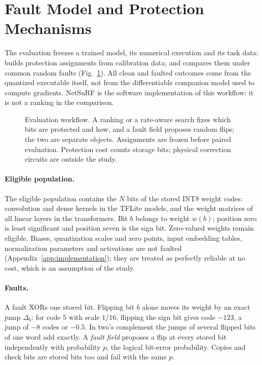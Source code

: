 \section{Fault Model and Protection Mechanisms}\label{sec:fault}
The evaluation freezes a trained model, its numerical execution and its task data; builds protection assignments from calibration data; and compares them under common random faults (Fig.~\ref{fig:workflow}). All clean and faulted outcomes come from the quantized executable itself, not from the differentiable companion model used to compute gradients. NetSuRF is the software implementation of this workflow; it is not a ranking in the comparison.

\begin{figure}[t]
\centering
\caption{Evaluation workflow. A ranking or a rate-aware search fixes which bits are protected and how, and a fault field proposes random flips; the two are separate objects. Assignments are frozen before paired evaluation. Protection cost counts storage bits; physical correction circuits are outside the study.}
\label{fig:workflow}
\end{figure}

\paragraph{Eligible population.} The eligible population contains the $N$ bits of the stored INT8 weight codes: convolution and dense kernels in the TFLite models, and the weight matrices of all linear layers in the transformers. Bit $b$ belongs to weight $w(b)$; position zero is least significant and position seven is the sign bit. Zero-valued weights remain eligible. Biases, quantization scales and zero points, input embedding tables, normalization parameters and activations are not faulted (Appendix~\ref{app:implementation}); they are treated as perfectly reliable at no cost, which is an assumption of the study.

\paragraph{Faults.} A fault XORs one stored bit. Flipping bit $b$ alone moves its weight by an exact jump $\Delta_b$: for code $5$ with scale $1/16$, flipping the sign bit gives code $-123$, a jump of $-8$ codes or $-0.5$. In two's complement the jumps of several flipped bits of one word add exactly. A \emph{fault field} proposes a flip at every stored bit independently with probability $p$, the logical bit-error probability. Copies and check bits are stored bits too and fail with the same $p$.

